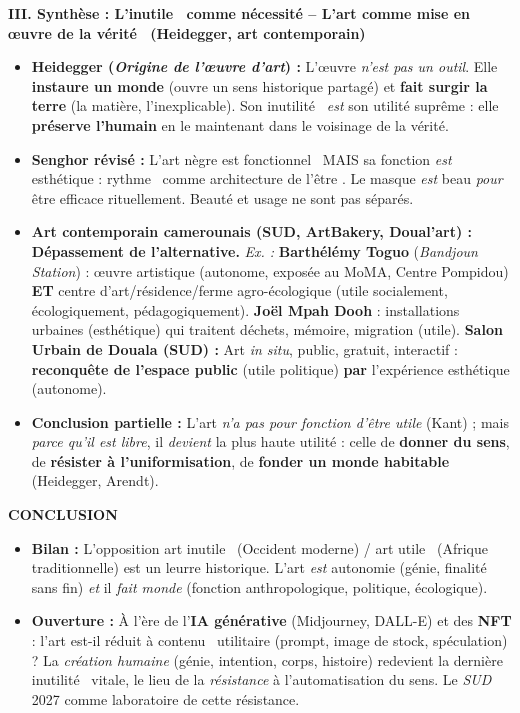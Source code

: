 \documentclass[11pt]{article}
\begin{document}
\begin{corrige}
\textbf{III. Synthèse : L'\guillemotleft inutile \guillemotright\ comme nécessité – L'art comme \guillemotleft mise en œuvre de la vérité \guillemotright\ (Heidegger, art contemporain)}
\begin{itemize}
\item \textbf{Heidegger (\emph{Origine de l'œuvre d'art}) :} L'œuvre \emph{n'est pas un outil}. Elle \textbf{instaure un monde} (ouvre un sens historique partagé) et \textbf{fait surgir la terre} (la matière, l'inexplicable). Son \guillemotleft inutilité \guillemotright\ \emph{est} son utilité suprême : elle \textbf{préserve l'humain} en le maintenant dans le voisinage de la vérité.
\item \textbf{Senghor révisé :} \guillemotleft L'art nègre est fonctionnel \guillemotright\ MAIS sa fonction \emph{est} esthétique : \guillemotleft rythme \guillemotright\ comme \guillemotleft architecture de l'être \guillemotright. Le masque \emph{est} beau \emph{pour} être efficace rituellement. Beauté et usage ne sont pas séparés.
\item \textbf{Art contemporain camerounais (SUD, ArtBakery, Doual'art) :} \textbf{Dépassement de l'alternative.} \emph{Ex. :} \textbf{Barthélémy Toguo} (\emph{Bandjoun Station}) : œuvre artistique (autonome, exposée au MoMA, Centre Pompidou) \textbf{ET} centre d'art/résidence/ferme agro-écologique (utile socialement, écologiquement, pédagogiquement). \textbf{Joël Mpah Dooh} : installations urbaines (esthétique) qui traitent déchets, mémoire, migration (utile). \textbf{Salon Urbain de Douala (SUD) :} Art \emph{in situ}, public, gratuit, interactif : \textbf{reconquête de l'espace public} (utile politique) \textbf{par} l'expérience esthétique (autonome).
\item \textbf{Conclusion partielle :} L'art \emph{n'a pas pour fonction d'être utile} (Kant) ; mais \emph{parce qu'il est libre}, il \emph{devient} la plus haute utilité : celle de \textbf{donner du sens}, de \textbf{résister à l'uniformisation}, de \textbf{fonder un monde habitable} (Heidegger, Arendt).
\end{itemize}

\textbf{CONCLUSION}
\begin{itemize}
\item \textbf{Bilan :} L'opposition \guillemotleft art inutile \guillemotright\ (Occident moderne) / \guillemotleft art utile \guillemotright\ (Afrique traditionnelle) est un leurre historique. L'art \emph{est} autonomie (génie, finalité sans fin) \emph{et} il \emph{fait monde} (fonction anthropologique, politique, écologique).
\item \textbf{Ouverture :} À l'ère de l'\textbf{IA générative} (Midjourney, DALL-E) et des \textbf{NFT} : l'art est-il réduit à \guillemotleft contenu \guillemotright\ utilitaire (prompt, image de stock, spéculation) ? La \emph{création humaine} (génie, intention, corps, histoire) redevient la dernière \guillemotleft inutilité \guillemotright\ vitale, le lieu de la \emph{résistance} à l'automatisation du sens. Le \emph{SUD} 2027 comme laboratoire de cette résistance.
\end{itemize}
\end{corrige}
\end{document}
